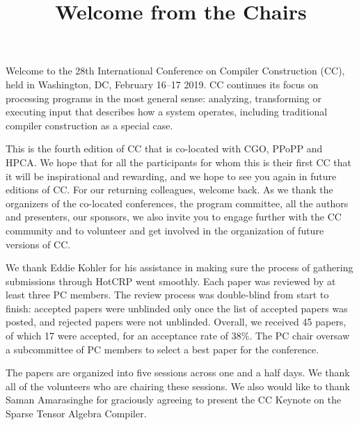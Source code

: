 \documentclass[12pt,letterpaper]{article}
\begin{document}
\title{\sffamily\bfseries Welcome from the Chairs}
\date{}

\maketitle
\thispagestyle{empty}
\pagestyle{empty}

Welcome to the 28th International Conference on Compiler Construction (CC), held in Washington, DC, February 16--17 2019. CC continues its focus on processing programs in the most general sense: analyzing, transforming or executing input that describes how a system operates, including traditional compiler construction as a special case.

This is  the fourth edition of CC that is co-located with CGO, PPoPP and HPCA. 
We hope that for all the participants for whom this is their first CC that it will be inspirational and rewarding, and we hope to see you again in future editions of CC. For our returning colleagues, welcome back. As we thank the organizers of the co-located conferences, the program committee, all the authors and presenters, our sponsors, we also invite you to engage further with the CC community and to volunteer and get involved in the organization of future versions of CC.

We thank Eddie Kohler for his assistance in making sure the process of gathering submissions through HotCRP went smoothly.  Each paper was reviewed by at least three PC members. The review process was double-blind from start to finish: accepted papers were unblinded only once the list of accepted papers was posted, and rejected papers were not unblinded. Overall, we received 45 papers, of which 17 were accepted, for an acceptance rate of 38\%. The PC chair oversaw a subcommittee of PC members to select a best paper for the conference.

The papers are organized into five sessions across one and a half days. We thank all of the volunteers who are chairing these sessions. We also would like to thank Saman Amarasinghe for graciously agreeing to present the CC Keynote on the Sparse Tensor Algebra Compiler.
\end{document}
